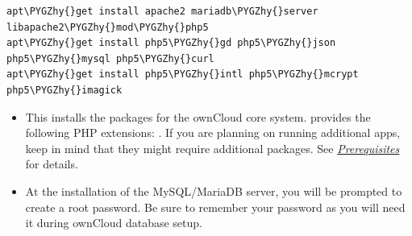 \documentclass[letterpaper,10pt,english]{sphinxmanual}
\def\PYGZhy{\char`\-}
\begin{document}
\begin{Verbatim}[commandchars=\\\{\}]
apt\PYGZhy{}get install apache2 mariadb\PYGZhy{}server libapache2\PYGZhy{}mod\PYGZhy{}php5
apt\PYGZhy{}get install php5\PYGZhy{}gd php5\PYGZhy{}json php5\PYGZhy{}mysql php5\PYGZhy{}curl
apt\PYGZhy{}get install php5\PYGZhy{}intl php5\PYGZhy{}mcrypt php5\PYGZhy{}imagick
\end{Verbatim}
\begin{itemize}
\item {} 
This installs the packages for the ownCloud core system.
 provides the following PHP extensions: . If you are planning
on running additional apps, keep in mind that they might require additional
packages.  See {\hyperref[installation/source_installation:prerequisites-label]{\emph{Prerequisites}}} for details.

\item {} 
At the installation of the MySQL/MariaDB server, you will be prompted to
create a root password. Be sure to remember your password as you will need it
during ownCloud database setup.

\end{itemize}
\end{document}
